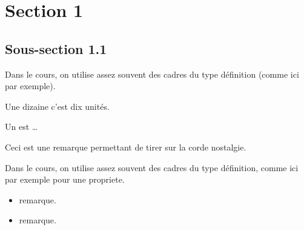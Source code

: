 \section{Section 1}
\subsection{Sous-section 1.1}
\begin{definition}
    Dans le cours, on utilise assez souvent des cadres du type
    définition (comme ici par exemple).

    Une dizaine c'est dix unités.

    Un  est \dots

\end{definition}
\begin{remarque}
    Ceci est une remarque permettant de tirer sur la corde nostalgie.

    \begin{center}
    \end{center}


\end{remarque}
\begin{propriete}
  Dans le cours, on utilise assez souvent des cadres du type
  définition, comme ici par exemple pour une propriete.
\end{propriete}
\begin{remarques}
  \begin{itemize}
    \item remarque.
    \item remarque.
  \end{itemize}
\end{remarques}

